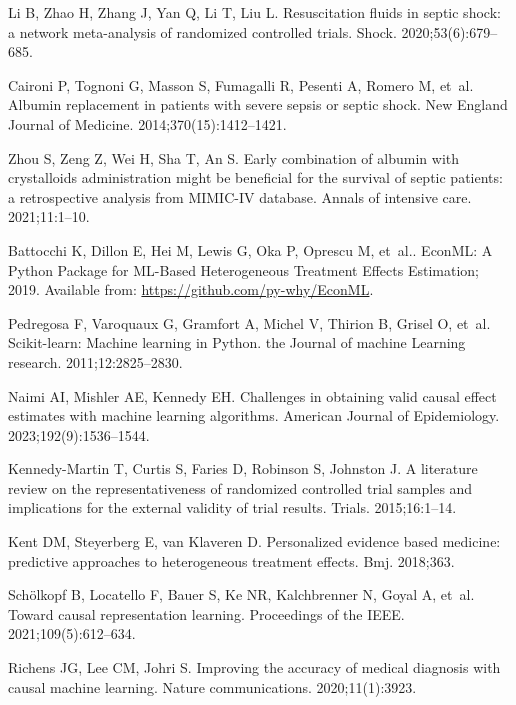 \documentclass[10pt,letterpaper]{article}
\begin{document}
\begin{thebibliography}{100}
  Li B, Zhao H, Zhang J, Yan Q, Li T, Liu L.
  \newblock Resuscitation fluids in septic shock: a network meta-analysis of randomized controlled trials.
  \newblock Shock. 2020;53(6):679--685.

  Caironi P, Tognoni G, Masson S, Fumagalli R, Pesenti A, Romero M, et~al.
  \newblock Albumin replacement in patients with severe sepsis or septic shock.
  \newblock New England Journal of Medicine. 2014;370(15):1412--1421.

  Zhou S, Zeng Z, Wei H, Sha T, An S.
  \newblock Early combination of albumin with crystalloids administration might be beneficial for the survival of septic patients: a retrospective analysis from MIMIC-IV database.
  \newblock Annals of intensive care. 2021;11:1--10.

  Battocchi K, Dillon E, Hei M, Lewis G, Oka P, Oprescu M, et~al.. {EconML}: {A Python Package for ML-Based Heterogeneous Treatment Effects Estimation}; 2019.
  \newblock Available from: \url{https://github.com/py-why/EconML}.

  Pedregosa F, Varoquaux G, Gramfort A, Michel V, Thirion B, Grisel O, et~al.
  \newblock Scikit-learn: Machine learning in Python.
  \newblock the Journal of machine Learning research. 2011;12:2825--2830.

  Naimi AI, Mishler AE, Kennedy EH.
  \newblock Challenges in obtaining valid causal effect estimates with machine learning algorithms.
  \newblock American Journal of Epidemiology. 2023;192(9):1536--1544.

  Kennedy-Martin T, Curtis S, Faries D, Robinson S, Johnston J.
  \newblock A literature review on the representativeness of randomized controlled trial samples and implications for the external validity of trial results.
  \newblock Trials. 2015;16:1--14.

  Kent DM, Steyerberg E, van Klaveren D.
  \newblock Personalized evidence based medicine: predictive approaches to heterogeneous treatment effects.
  \newblock Bmj. 2018;363.

  Schölkopf B, Locatello F, Bauer S, Ke NR, Kalchbrenner N, Goyal A, et~al.
  \newblock Toward causal representation learning.
  \newblock Proceedings of the IEEE. 2021;109(5):612--634.

  Richens JG, Lee CM, Johri S.
  \newblock Improving the accuracy of medical diagnosis with causal machine learning.
  \newblock Nature communications. 2020;11(1):3923.


\end{thebibliography}
\end{document}
